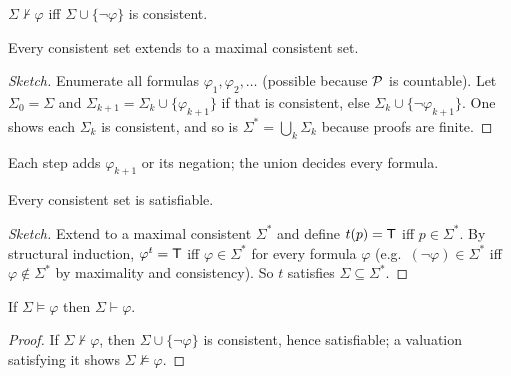 \begin{lemma}
$\Sigma\nvdash\varphi$ iff $\Sigma\cup\{\neg\varphi\}$ is consistent.
\end{lemma}

\begin{theorem}
Every consistent set extends to a maximal consistent set.
\end{theorem}
\begin{proof}[Sketch]
Enumerate all formulas $\varphi_1,\varphi_2,\dots$ (possible because $\mathcal{P}$ is countable).
Let $\Sigma_0=\Sigma$ and $\Sigma_{k+1}=\Sigma_k\cup\{\varphi_{k+1}\}$ if that is
consistent, else $\Sigma_k\cup\{\neg\varphi_{k+1}\}$. One shows each $\Sigma_k$ is
consistent, and so is $\Sigma^*=\bigcup_k\Sigma_k$ because proofs are finite.
\end{proof}
\begin{center}

\small Each step adds $\varphi_{k+1}$ or its negation; the union decides every formula.
\end{center}

\begin{theorem}
Every consistent set is satisfiable.
\end{theorem}
\begin{proof}[Sketch]
Extend to a maximal consistent $\Sigma^*$ and define $t(p)=\mathsf{T}$ iff $p\in\Sigma^*$. By
structural induction, $\varphi^t=\mathsf{T}$ iff $\varphi\in\Sigma^*$ for every formula $\varphi$
(e.g.\ $(\neg\varphi)\in\Sigma^*$ iff $\varphi\notin\Sigma^*$ by maximality and
consistency). So $t$ satisfies $\Sigma\subseteq\Sigma^*$.
\end{proof}

\begin{corollary}[Completeness]
If $\Sigma\models\varphi$ then $\Sigma\vdash\varphi$.
\end{corollary}
\begin{proof}
If $\Sigma\nvdash\varphi$, then $\Sigma\cup\{\neg\varphi\}$ is consistent, hence satisfiable;
a valuation satisfying it shows $\Sigma\not\models\varphi$.
\end{proof}

